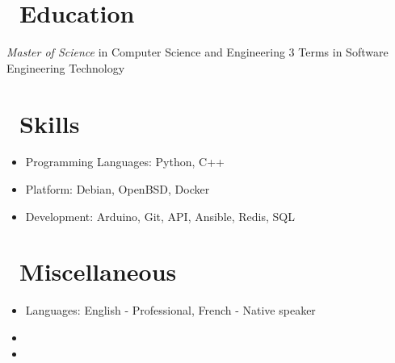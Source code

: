 \documentclass{resume}
\begin{document}
\section{\faGraduationCap\ Education}
\textit{Master of Science} in Computer Science and Engineering
3 Terms in Software Engineering Technology

\section{\faCogs\ Skills}
\begin{itemize}[parsep=0.5ex]
  \item Programming Languages: Python, C++
  \item Platform: Debian, OpenBSD, Docker
  \item Development: Arduino, Git, API, Ansible, Redis, SQL
\end{itemize}


\section{\faInfo\ Miscellaneous}
\begin{itemize}[parsep=0.5ex]
  \item Languages: English - Professional, French - Native speaker
  \item {}
  \item {}
\end{itemize}

%
%
\end{document}
